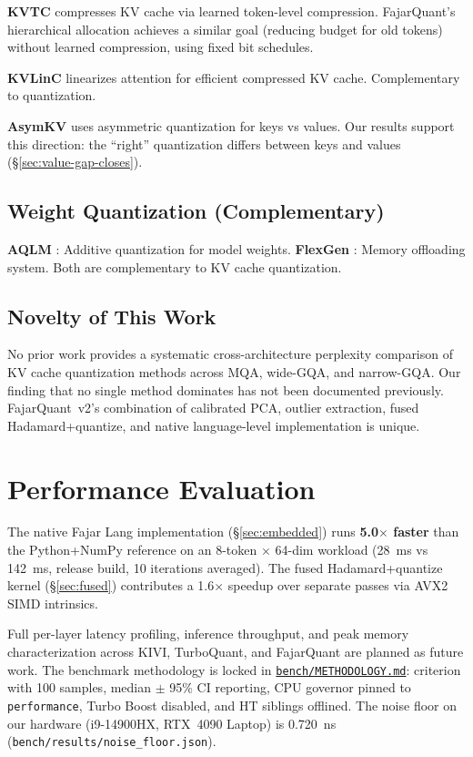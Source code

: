 \documentclass[10pt,twocolumn]{article}
\begin{document}
\textbf{KVTC} \citep{zhang2024kvtc} compresses KV cache via
learned token-level compression. FajarQuant's hierarchical allocation
achieves a similar goal (reducing budget for old tokens) without learned
compression, using fixed bit schedules.

\textbf{KVLinC} \citep{wang2025kvlinc} linearizes attention for
efficient compressed KV cache. Complementary to quantization.

\textbf{AsymKV} \citep{he2024asymkv} uses asymmetric quantization
for keys vs values. Our results support this direction: the
``right'' quantization differs between keys and values
(\S\ref{sec:value-gap-closes}).

\subsection{Weight Quantization (Complementary)}

\textbf{AQLM} \citep{egiazarian2024aqlm}: Additive quantization for
model weights. \textbf{FlexGen} \citep{sheng2023flexgen}: Memory
offloading system. Both are complementary to KV cache quantization.

\subsection{Novelty of This Work}

No prior work provides a systematic cross-architecture perplexity
comparison of KV cache quantization methods across MQA, wide-GQA, and
narrow-GQA. Our finding that no single method dominates has not been
documented previously. FajarQuant~v2's combination of calibrated PCA,
outlier extraction, fused Hadamard+quantize, and native language-level
implementation is unique.

\section{Performance Evaluation}
\label{sec:perf}

The native Fajar Lang implementation (\S\ref{sec:embedded}) runs
\textbf{5.0$\times$ faster} than the Python+NumPy reference on an
8-token $\times$ 64-dim workload (28~ms vs 142~ms, release build,
10 iterations averaged). The fused Hadamard+quantize kernel
(\S\ref{sec:fused}) contributes a 1.6$\times$ speedup over separate
passes via AVX2 SIMD intrinsics.

Full per-layer latency profiling, inference throughput, and peak memory
characterization across KIVI, TurboQuant, and FajarQuant are planned
as future work. The benchmark methodology is locked in
\href{https://github.com/fajarkraton/fajarquant/blob/main/bench/METHODOLOGY.md}{\texttt{bench/METHODOLOGY.md}}:
criterion with 100 samples, median $\pm$ 95\% CI reporting, CPU
governor pinned to \texttt{performance}, Turbo Boost disabled, and
HT siblings offlined. The noise floor on our hardware (i9-14900HX,
RTX~4090 Laptop) is 0.720~ns
(\texttt{bench/results/noise\_floor.json}).
\end{document}
